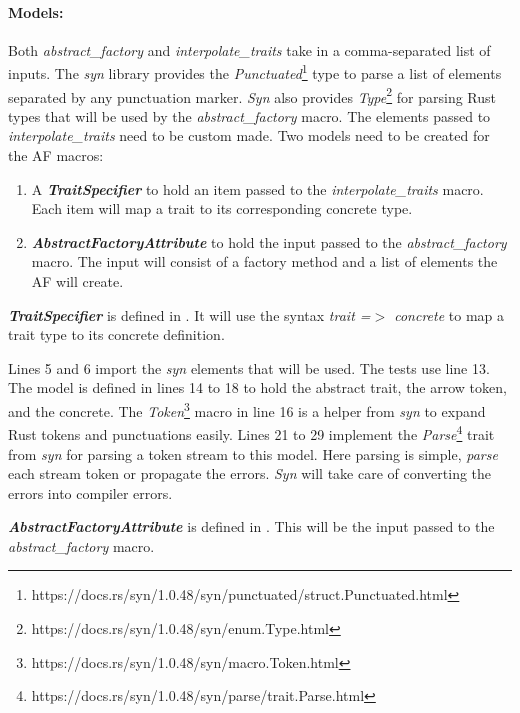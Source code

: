 \paragraph{Models:}
Both \textit{abstract\_factory} and \textit{interpolate\_traits} take in a comma-separated list of inputs.
The \textit{syn} library provides the \textit{Punctuated}\footnote{https://docs.rs/syn/1.0.48/syn/punctuated/struct.Punctuated.html} type to parse a list of elements separated by any punctuation marker.
\textit{Syn} also provides \textit{Type}\footnote{https://docs.rs/syn/1.0.48/syn/enum.Type.html} for parsing Rust types that will be used by the \textit{abstract\_factory} macro.
The elements passed to \textit{interpolate\_traits} need to be custom made.
Two models need to be created for the AF macros:

\begin{enumerate}
	\item A \textbf{\textit{TraitSpecifier}} to hold an item passed to the \textit{interpolate\_traits} macro.
	      Each item will map a trait to its corresponding concrete type.
	\item \textbf{\textit{AbstractFactoryAttribute}} to hold the input passed to the \textit{abstract\_factory} macro.
	      The input will consist of a factory method and a list of elements the AF will create.
\end{enumerate}

\textbf{\textit{TraitSpecifier}} is defined in .
It will use the syntax \textit{trait =$>$ concrete} to map a trait type to its concrete definition.

Lines 5 and 6 import the \textit{syn} elements that will be used.
The tests use line 13.
The model is defined in lines 14 to 18 to hold the abstract trait, the arrow token, and the concrete.
The \textit{Token}\footnote{https://docs.rs/syn/1.0.48/syn/macro.Token.html} macro in line 16 is a helper from \textit{syn} to expand Rust tokens and punctuations easily.
Lines 21 to 29 implement the \textit{Parse}\footnote{https://docs.rs/syn/1.0.48/syn/parse/trait.Parse.html} trait from \textit{syn} for parsing a token stream to this model.
Here parsing is simple, \textit{parse} each stream token or propagate the errors.
\textit{Syn} will take care of converting the errors into compiler errors.

\textbf{\textit{AbstractFactoryAttribute}} is defined in .
This will be the input passed to the \textit{abstract\_factory} macro.

